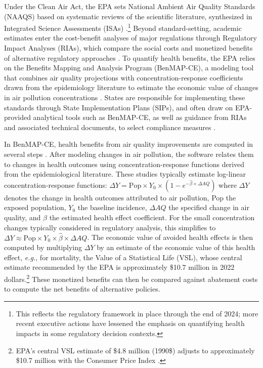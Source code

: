 \documentclass[12pt]{article}
\begin{document}
		Under the Clean Air Act, the EPA sets National Ambient Air Quality Standards (NAAQS) based on systematic reviews of the scientific literature, synthesized in Integrated Science Assessments (ISAs) \citep{u.s.epa_preamble_2015}.\footnote{This reflects the regulatory framework in place through the end of 2024; more recent executive actions have lessened the emphasis on quantifying health impacts in some regulatory decision contexts.} Beyond standard-setting, academic estimates enter the cost-benefit analyses of major regulations through Regulatory Impact Analyses (RIAs), which compare the social costs and monetized benefits of alternative regulatory approaches \citep{u.s.epa_final_2024}. To quantify health benefits, the EPA relies on the Benefits Mapping and Analysis Program (BenMAP-CE), a modeling tool that combines air quality projections with concentration-response coefficients drawn from the epidemiology literature to estimate the economic value of changes in air pollution concentrations \citep{sacks_environmental_2018}. States are responsible for implementing these standards through State Implementation Plans (SIPs), and often draw on EPA-provided analytical tools such as BenMAP-CE, as well as guidance from RIAs and associated technical documents, to select compliance measures \citep{u.s.epa_environmental_2023}.
		
		In BenMAP-CE, health benefits from air quality improvements are computed in several steps \citep{sacks_environmental_2018}. After modeling changes in air pollution, the software relates them to changes in health outcomes using concentration-response functions derived from the epidemiological literature. These studies typically estimate log-linear concentration-response functions: $\Delta Y = \text{Pop} \times Y_0 \times (1 - e^{-\hat{\beta} \times \Delta AQ})$ where $\Delta Y$ denotes the change in health outcomes attributed to air pollution, Pop the exposed population, $Y_0$ the baseline incidence, $\Delta AQ$ the specified change in air quality, and $\hat{\beta}$ the estimated health effect coefficient. For the small concentration changes typically considered in regulatory analysis, this simplifies to $\Delta Y \approx \text{Pop} \times Y_0 \times \hat{\beta} \times \Delta AQ$. The economic value of avoided health effects is then computed by multiplying $\Delta Y$ by an estimate of the economic value of this health effect, \textit{e.g.}, for mortality, the Value of a Statistical Life (VSL), whose central estimate recommended by the EPA is approximately \$10.7 million in 2022 dollars.\footnote{EPA's central VSL estimate of \$4.8 million (1990\$) adjusts to approximately \$10.7 million with the Consumer Price Index \citep{u.s.epa_guidelines_2024}.} These monetized benefits can then be compared against abatement costs to compute the net benefits of alternative policies. 
\end{document}
